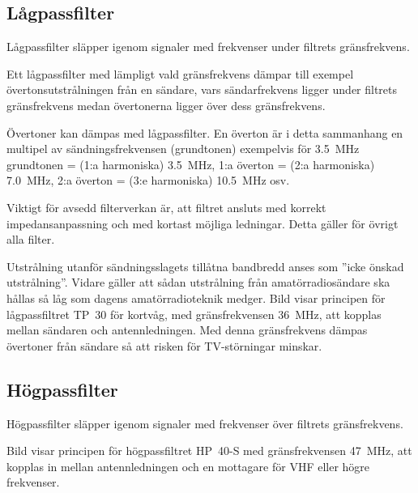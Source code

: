 \subsection{Lågpassfilter}
\label{Lågpassfilter}


Lågpassfilter släpper igenom signaler med frekvenser under filtrets
gränsfrekvens.

Ett lågpassfilter med lämpligt vald gränsfrekvens dämpar till exempel
övertonsutstrålningen från en sändare, vars sändarfrekvens ligger under filtrets
gränsfrekvens medan övertonerna ligger över dess gränsfrekvens.

Övertoner kan dämpas med lågpassfilter.
En överton är i detta sammanhang en multipel av sändningsfrekvensen
(grundtonen) exempelvis för
\qty{3,5}{\mega\hertz} grundtonen = (1:a harmoniska) \qty{3,5}{\mega\hertz},
1:a överton = (2:a harmoniska) \qty{7,0}{\mega\hertz},
2:a överton = (3:e harmoniska) \qty{10,5}{\mega\hertz} osv.

Viktigt för avsedd filterverkan är, att filtret ansluts med korrekt
impedansanpassning och med kortast möjliga ledningar.
Detta gäller för övrigt alla filter.

Utstrålning utanför sändningsslagets tillåtna bandbredd anses som
''icke önskad utstrålning''.
Vidare gäller att sådan utstrålning från amatörradiosändare ska hållas så låg
som dagens amatörradioteknik medger.
Bild  visar principen för lågpassfiltret TP~30 för kortvåg,
med gränsfrekvensen \qty{36}{\mega\hertz}, att kopplas mellan sändaren och
antennledningen.
Med denna gränsfrekvens dämpas övertoner från sändare så att risken för
TV-störningar minskar.


\newpage
\subsection{Högpassfilter}
\label{Högpassfilter}

Högpassfilter släpper igenom signaler med frekvenser över filtrets
gränsfrekvens.

Bild  visar principen för högpassfiltret HP~40-S med
gränsfrekvensen \qty{47}{\mega\hertz}, att kopplas in mellan antennledningen och
en mottagare för VHF eller högre frekvenser.

